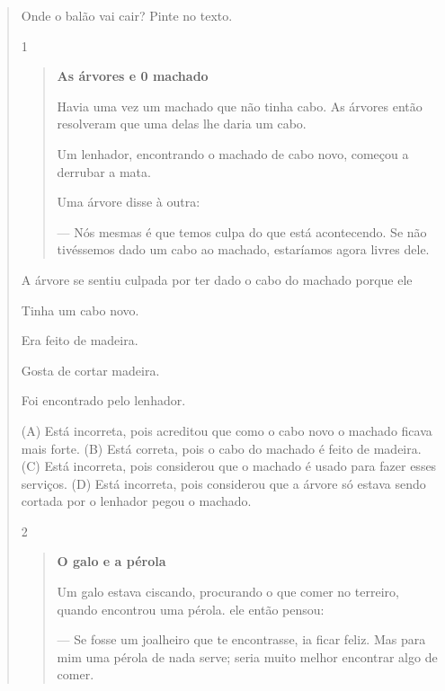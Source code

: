 \begin{verse}
Onde o balão vai cair? Pinte no texto.


\num{1}

\begin{quote}
\textbf{As árvores e 0 machado}

Havia uma vez um machado que não tinha cabo.
As árvores então resolveram que uma delas lhe daria
um cabo.

Um lenhador, encontrando o machado de cabo novo,
começou a derrubar a mata.

Uma árvore disse à outra:

--- Nós mesmas é que temos culpa do que está
acontecendo. Se não tivéssemos dado um cabo ao machado,
estaríamos agora livres dele.
\end{quote}


A árvore se sentiu culpada por ter dado o cabo do machado porque ele

\begin{escolha}
\item Tinha um cabo novo.

\item Era feito de madeira.

\item Gosta de cortar madeira.

\item Foi encontrado pelo lenhador.
\end{escolha}


(A) Está incorreta, pois acreditou que como o cabo novo o machado ficava
mais forte.
(B) Está correta, pois o cabo do machado é feito de madeira.
(C) Está incorreta, pois considerou que o machado é usado para fazer
esses serviços.
(D) Está incorreta, pois considerou que a árvore só estava sendo cortada
por o lenhador pegou o machado.

\num{2}

\begin{quote}
\textbf{O galo e a pérola}

Um galo estava ciscando, procurando o que comer no terreiro,
quando encontrou uma pérola. ele então pensou:

--- Se fosse um joalheiro que te encontrasse, ia ficar feliz.
Mas para mim uma pérola de nada serve; seria muito melhor
encontrar algo de comer.


\end{quote}
\end{verse}
